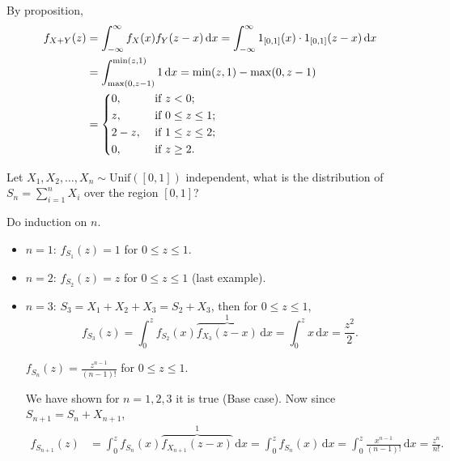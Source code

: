 \begin{explanation}
    By proposition,
    \begin{align*}
        f_{X + Y}(z) &= \int _{-\infty }^{\infty} f_X(x) f_Y(z - x) \, \mathrm{d} x = \int _{-\infty }^{\infty} 1_{[0, 1]}(x) \cdot 1_{[0, 1]}(z - x) \, \mathrm{d} x \\
        &= \int _{\max (0, z-1)}^{\min (z, 1)} 1 \, \mathrm{d} x = \min (z, 1) - \max (0, z - 1) \\
        &= \begin{dcases}
            0, &\text{ if } z < 0 ;\\
            z, &\text{ if } 0 \le z \le 1 ;\\
            2 - z, &\text{ if } 1 \le z \le 2 ;\\
            0, &\text{ if } z \ge 2 .
        \end{dcases} 
    \end{align*}
\end{explanation}

\begin{question}
    Let \(X_1, X_2, \dots , X_n \sim \mathrm{Unif}([0, 1]) \) independent, what is the distribution of \(S_n = \sum_{i=1}^n X_i \) over the region \([0, 1]\)?    
\end{question}

\begin{answer}
    Do induction on \(n\). 
    \begin{itemize}
        \item \(n = 1\): \(f_{S_1}(z) = 1\) for \(0 \le z \le 1\). 
        \item \(n = 2\): \(f_{S_2}(z) = z\) for \(0 \le z \le 1\) (last example).
        \item \(n = 3\): \(S_3 = X_1 + X_2 + X_3 = S_2 + X_3\), then for \(0 \le z \le 1\),
        \[
            f_{S_3}(z) = \int _0^z f_{S_2}(x) \overbrace{f_{X_3}(z - x)}^1 \, \mathrm{d} x = \int _0^z x \, \mathrm{d} x = \frac{z^2}{2}.  
        \]
        \begin{claim}
            \(f_{S_n}(z) = \frac{z^{n-1}}{(n-1)!}\) for \(0 \le z \le 1\).  
        \end{claim}
        \begin{explanation}
            We have shown for \(n = 1, 2, 3\) it is true (Base case). Now since \(S_{n+1} = S_n + X_{n+1}\),
            \begin{align*}
                f_{S_{n+1}}(z) &= \int _0^z f_{S_n}(x) \overbrace{f_{X_{n+1}}(z - x)}^1 \, \mathrm{d} x = \int _0^z f_{S_n}(x) \, \mathrm{d} x = \int _0^z \frac{x^{n-1}}{(n-1)!} \, \mathrm{d} x = \frac{z^n}{n!}.   
            \end{align*}  
        \end{explanation}
    \end{itemize} 

\end{answer}

